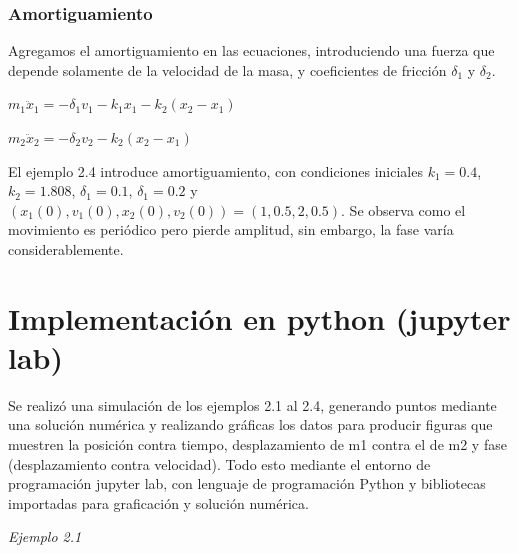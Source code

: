 \documentclass[a4paper]{article}
\begin{document}
\subsubsection{Amortiguamiento}

Agregamos el amortiguamiento en las ecuaciones, introduciendo una fuerza que depende solamente de la velocidad de la masa, y coeficientes de fricción ${\delta}_1$ y ${\delta}_2$.

\begin{center}
	$m_1 \ddot{x}_1 = -{\delta}_1 v_1 - k_1 x_1 - k_2 (x_2 - x_1)$

	$m_2 \ddot{x}_2 = -{\delta}_2 v_2 -k_2 (x_2 - x_1)$
\end{center}

El ejemplo 2.4 introduce amortiguamiento, con condiciones iniciales $k_1 = 0.4$, $k_2 = 1.808$, ${\delta}_1 = 0.1$, ${\delta}_1 = 0.2$ y $(x_1(0),v_1(0),x_2(0),v_2(0)) = (1,0.5,2,0.5)$. Se observa como el movimiento es periódico pero pierde amplitud, sin embargo, la fase varía considerablemente.

\section{Implementación en python (jupyter lab)}

Se realizó una simulación de los ejemplos 2.1 al 2.4, generando puntos mediante una solución numérica y realizando gráficas los datos para producir figuras que muestren la posición contra tiempo, desplazamiento de m1 contra el de m2 y fase (desplazamiento contra velocidad). Todo esto mediante el entorno de programación jupyter lab, con lenguaje de programación Python y bibliotecas importadas para graficación y solución numérica.

\vspace{0.5cm}

\textit{Ejemplo 2.1}
\end{document}
